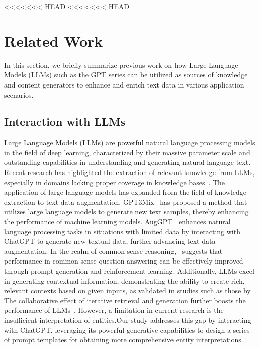 <<<<<<< HEAD
<<<<<<< HEAD

\section{Related Work}
\label{sec:related}
In this section, we briefly summarize previous work on how Large Language Models (LLMs) such as the GPT series can be utilized as sources of knowledge and content generators to enhance and enrich text data in various application scenarios.
\subsection{Interaction with LLMs}
Large Language Models (LLMs) are powerful natural language processing models in the field of deep learning, 
characterized by their massive parameter scale and outstanding capabilities in understanding and generating natural language text. 
Recent research has highlighted the extraction of relevant knowledge from LLMs, especially in domains lacking proper coverage in knowledge bases~\citep{fang2021leveraging}. 
The application of large language models has expanded from the field of knowledge extraction to text data augmentation. 
GPT3Mix~\citep{yoo2021gpt3mix} has proposed a method that utilizes large language models to generate new text samples, thereby enhancing the performance of machine learning models.
AugGPT~\citep{dai2023auggpt} enhances natural language processing tasks in situations with limited data by interacting with ChatGPT to generate new textual data, further advancing text data augmentation.
In the realm of common sense reasoning,~\citep{liu2021generated,liu2022rainier} suggests that performance in common sense question answering can be effectively improved through prompt generation and reinforcement learning. 
Additionally, LLMs excel in generating contextual information, demonstrating the ability to create rich, 
relevant contexts based on given inputs, as validated in studies such as those by~\citep{yu2022generate}. 
The collaborative effect of iterative retrieval and generation further boosts the performance of LLMs~\citep{shao2023enhancing}. 
However, a limitation in current research is the insufficient interpretation of entities.Our study addresses this gap by interacting with ChatGPT, 
leveraging its powerful generative capabilities to design a series of prompt templates for obtaining more comprehensive entity interpretations.


